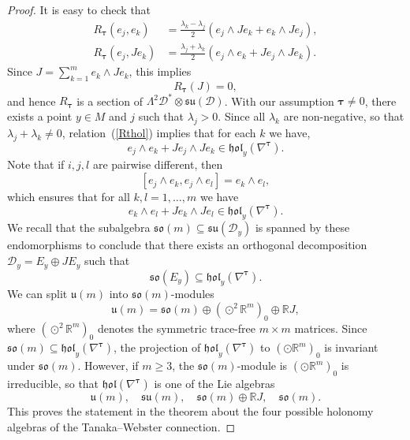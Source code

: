 \documentclass{amsart}
\theoremstyle{plain}
\theoremstyle{definition}
\def\so{\mathfrak{so}}
\def\su{\mathfrak{su}}
\def\u{\mathfrak{u}}
\newcommand{\hol}{\mathfrak{hol}}
\newcommand{\bt}{{\boldsymbol{\tau}}}
\newcommand{\Real}{\mathbb{R}}
\newcommand{\1}{\mathbf{1}}
\newcommand{\D}{{\mathcal D}}
\newcommand{\+}{\oplus}
\newcommand{\tcom}[1]{
 \marginpar{{\scriptsize  T: #1 }}}
\begin{document}
\begin{proof}
It is easy to check that 
\begin{align}\label{Rtaujk}R_\bt(e_j,e_k)&=\tfrac{\lambda_k-\lambda_j}{2}(e_j\wedge J e_{k}+e_{k}\wedge Je_{j}),\\
\label{Rtaujkm} R_\bt(e_j,Je_{k})&=\tfrac{\lambda_j+\lambda_k}{2}(e_j\wedge e_{k}+Je_{j}\wedge Je_{k}).
\end{align}
Since $J=\sum_{k=1}^m e_k\wedge Je_k$, this implies \begin{equation}\label{Rtau(J)}
R_\bt(J)=0,
\end{equation}
and
hence 
$R_\bt$ is a section of $\Lambda^2\D^*\otimes\su(\D)$.
With our assumption $\bt\neq 0$, there exists a point $y\in M$ and  $j$ such that $\lambda_j>0$. Since all $\lambda_k$ are non-negative, so that $\lambda_j+\lambda_k\not=0$, relation~(\ref{Rthol})  implies that for each $k$ we have,
 $$e_j\wedge e_{k}+Je_{j}\wedge Je_{k}\in \hol_y(\nabla^\bt).$$
Note that if $i,j,l$ are pairwise different, then $$[e_j\wedge e_k,e_j\wedge e_l]=e_k\wedge e_l,$$
which ensures that for all $k,l=1, \ldots, m$ we have
$$e_k\wedge e_{l}+Je_{k}\wedge Je_{l}\in \hol_y(\nabla^\bt).$$
We recall that the subalgebra $\so(m)\subseteq \su (\D_y)$ is spanned by these  endomorphisms
to conclude that there exists an orthogonal decomposition $\D_y=E_y\oplus JE_y$ such that
$$\so(E_y)\subseteq\hol_y(\nabla^\bt).$$ 
We can split $\u(m)$ into $\so(m)$-modules 
$$\u(m)=\so(m)\oplus (\odot^2 \Real^m)_0\oplus\Real J,$$
where $(\odot^2 \Real^m)_0$ denotes the symmetric trace-free $m\times m$ matrices.
Since $\so(m)\subseteq \hol_y(\nabla^\bt)$, the projection of $\hol_y(\nabla^\bt)$ to $ (\odot \Real^m)_0$ is invariant under $\so(m)$. However, 
if $m\geq 3$,  the $\so(m)$-module is $(\odot \Real^m)_0$ is irreducible, so that $\hol(\nabla^\bt)$ is one of the Lie algebras 
\begin{equation}\label{EqList}\u(m),\quad \su(m),\quad \so(m)\oplus\Real J,\quad \so(m).\end{equation}
This proves the statement in the theorem about the four possible holonomy algebras of the Tanaka--Webster connection.


\end{proof}
\end{document}
